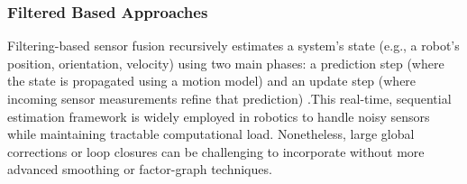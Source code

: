\subsubsection{Filtered Based Approaches}
Filtering-based sensor fusion recursively estimates a system’s state (e.g., a robot’s position, orientation, velocity) using two main phases: a prediction step (where the state is propagated using a motion model) and an update step (where incoming sensor measurements refine that prediction) \cite{thrun2005probabilistic}.This real-time, sequential estimation framework is widely employed in robotics to handle noisy sensors while maintaining tractable computational load. Nonetheless, large global corrections or loop closures can be challenging to incorporate without more advanced smoothing or factor-graph techniques\cite{cadena2016past}.

